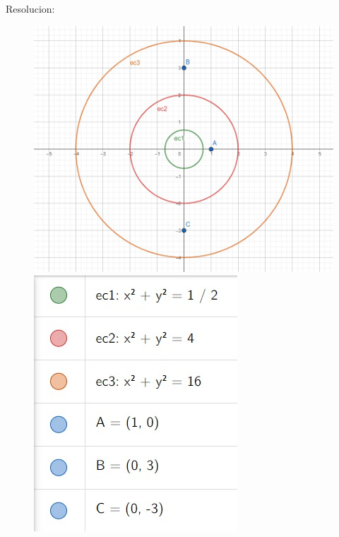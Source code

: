 \documentclass[12pt]{report}
\begin{document}
Resolucion:
\begin{figure}[h]
    \centering
    \begin{minipage}{0.35\textwidth}
        \centering
        \includegraphics[width=\textwidth]{./Imagenes/foto1Ej5.jpeg}
    \end{minipage}\hfill
    \begin{minipage}{0.35\textwidth}
        \centering
        \includegraphics[width=\textwidth]{./Imagenes/foto2Ej5.jpeg}
    \end{minipage}
\end{figure}
       
\end{document}
